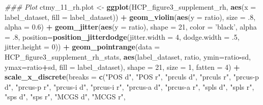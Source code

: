 \documentclass[
]{article}
\newenvironment{Shaded}{\begin{snugshade}}{\end{snugshade}}
\newcommand{\CommentTok}[1]{\textcolor[rgb]{0.56,0.35,0.01}{\textit{#1}}}
\newcommand{\DataTypeTok}[1]{\textcolor[rgb]{0.13,0.29,0.53}{#1}}
\newcommand{\DecValTok}[1]{\textcolor[rgb]{0.00,0.00,0.81}{#1}}
\newcommand{\FloatTok}[1]{\textcolor[rgb]{0.00,0.00,0.81}{#1}}
\newcommand{\KeywordTok}[1]{\textcolor[rgb]{0.13,0.29,0.53}{\textbf{#1}}}
\newcommand{\NormalTok}[1]{#1}
\newcommand{\OperatorTok}[1]{\textcolor[rgb]{0.81,0.36,0.00}{\textbf{#1}}}
\newcommand{\StringTok}[1]{\textcolor[rgb]{0.31,0.60,0.02}{#1}}
\begin{document}
\begin{Shaded}
\begin{Highlighting}[]
\CommentTok{### Plot}
\NormalTok{ctmy_}\DecValTok{11}\NormalTok{_rh.plot <-}\StringTok{ }\KeywordTok{ggplot}\NormalTok{(HCP_figure3_supplement_rh, }
                          \KeywordTok{aes}\NormalTok{(}\DataTypeTok{x =}\NormalTok{ label_dataset, }
                              \DataTypeTok{fill =}\NormalTok{ label_dataset)) }\OperatorTok{+}\StringTok{ }
\StringTok{  }\KeywordTok{geom_violin}\NormalTok{(}\KeywordTok{aes}\NormalTok{(}\DataTypeTok{y =}\NormalTok{ ratio), }\DataTypeTok{size =} \FloatTok{.8}\NormalTok{, }\DataTypeTok{alpha =} \FloatTok{0.6}\NormalTok{) }\OperatorTok{+}\StringTok{ }
\StringTok{  }\KeywordTok{geom_jitter}\NormalTok{(}\KeywordTok{aes}\NormalTok{(}\DataTypeTok{y =}\NormalTok{ ratio), }
              \DataTypeTok{shape =} \DecValTok{21}\NormalTok{, }\DataTypeTok{color =} \StringTok{'black'}\NormalTok{, }\DataTypeTok{alpha =} \FloatTok{.8}\NormalTok{,}
              \DataTypeTok{position=}\KeywordTok{position_jitterdodge}\NormalTok{(}\DataTypeTok{jitter.width =} \DecValTok{4}\NormalTok{, }
                                            \DataTypeTok{dodge.width =} \FloatTok{.5}\NormalTok{, }\DataTypeTok{jitter.height =} \DecValTok{0}\NormalTok{)) }\OperatorTok{+}\StringTok{ }
\StringTok{  }\KeywordTok{geom_pointrange}\NormalTok{(}\DataTypeTok{data =}\NormalTok{ HCP_figure3_supplement_rh_stats, }
                  \KeywordTok{aes}\NormalTok{(label_dataset, ratio, }
                      \DataTypeTok{ymin=}\NormalTok{ratio}\OperatorTok{-}\NormalTok{sd, }\DataTypeTok{ymax=}\NormalTok{ratio}\OperatorTok{+}\NormalTok{sd, }
                      \DataTypeTok{fill =}\NormalTok{ label_dataset), }
                  \DataTypeTok{shape =} \DecValTok{21}\NormalTok{, }\DataTypeTok{size =} \DecValTok{1}\NormalTok{, }\DataTypeTok{fatten =} \DecValTok{4}\NormalTok{) }\OperatorTok{+}
\StringTok{  }\KeywordTok{scale_x_discrete}\NormalTok{(}\DataTypeTok{breaks =} \KeywordTok{c}\NormalTok{(}\StringTok{"POS d"}\NormalTok{, }\StringTok{"POS r"}\NormalTok{,}
                              \StringTok{"prculs d"}\NormalTok{, }\StringTok{"prculs r"}\NormalTok{,}
                   \StringTok{"prcus-p d"}\NormalTok{, }\StringTok{"prcus-p r"}\NormalTok{,}
                   \StringTok{"prcus-i d"}\NormalTok{, }\StringTok{"prcus-i r"}\NormalTok{,}
                   \StringTok{"prcus-a d"}\NormalTok{, }\StringTok{"prcus-a r"}\NormalTok{,}
                   \StringTok{"spls d"}\NormalTok{, }\StringTok{"spls r"}\NormalTok{,}
                   \StringTok{"sps d"}\NormalTok{, }\StringTok{"sps r"}\NormalTok{,}
                   \StringTok{"MCGS d"}\NormalTok{, }\StringTok{"MCGS r"}\NormalTok{, }

\end{Highlighting}
\end{Shaded}
\end{document}

